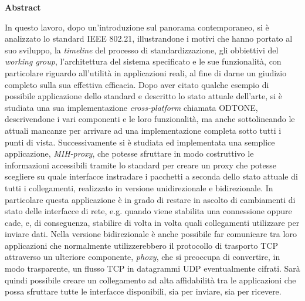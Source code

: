 \begin{center}
\LARGE{\textbf{Abstract}}
\end{center}
\vspace{3em}
In questo lavoro, dopo un'introduzione sul panorama contemporaneo, si è analizzato lo standard IEEE 802.21, illustrandone i motivi che hanno portato al suo sviluppo, la {\em timeline} del processo di standardizzazione, gli obbiettivi del {\em working group}, l'architettura del sistema specificato e le sue funzionalità, con particolare riguardo all'utilità in applicazioni reali, al fine di darne un giudizio completo sulla sua effettiva efficacia. Dopo aver citato qualche esempio di possibile applicazione dello standard e descritto lo stato attuale dell'arte, si è studiata una sua implementazione {\em cross-platform} chiamata ODTONE, descrivendone i vari componenti e le loro funzionalità, ma anche sottolineando le attuali mancanze per arrivare ad una implementazione completa sotto tutti i punti di vista. Successivamente si è studiata ed implementata una semplice applicazione, {\em MIH-proxy}, che potesse sfruttare in modo costruttivo le informazioni accessibili tramite lo standard per creare un proxy che potesse scegliere su quale interfacce instradare i pacchetti a seconda dello stato attuale di tutti i collegamenti, realizzato in versione unidirezionale e bidirezionale. In particolare questa applicazione è in grado di restare in ascolto di cambiamenti di stato delle interfacce di rete, e.g. quando viene stabilita una connessione oppure cade, e, di conseguenza, stabilire di volta in volta quali collegamenti utilizzare per inviare dati. Nella versione bidirezionale è anche possibile far comunicare tra loro applicazioni che normalmente utilizzerebbero il protocollo di trasporto TCP attraverso un ulteriore componente, {\em phoxy}, che si preoccupa di convertire, in modo trasparente, un flusso TCP in datagrammi UDP eventualmente cifrati. Sarà quindi possibile creare un collegamento ad alta affidabilità tra le applicazioni che possa sfruttare tutte le interfacce disponibili, sia per inviare, sia per ricevere.